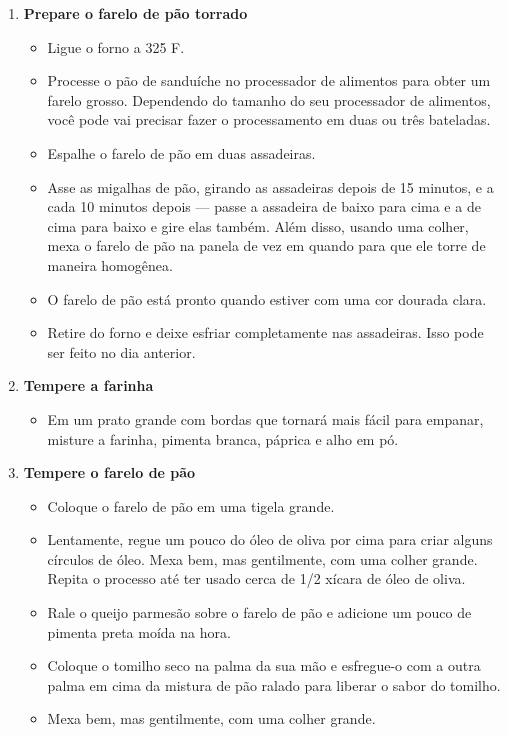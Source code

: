 \documentclass [11pt, papel de carta] {article}
\begin{document}
\begin {description}
\begin {enumerate}
\begin {itemize}
\end {itemize}
\item {\bf Prepare o farelo de pão torrado}
\begin {itemize}
\item Ligue o forno a 325 F.
\item Processe o pão de sanduíche  no processador de alimentos para obter um farelo grosso. Dependendo do tamanho do seu processador de alimentos, você pode vai precisar fazer o processamento em duas ou três bateladas.
\item Espalhe o farelo de p\~ao em duas assadeiras.
\item Asse as migalhas de pão, girando as assadeiras depois de 15 minutos, e a cada 10 minutos depois --- passe a assadeira de baixo para cima e a de cima para baixo e gire elas tamb\'em. Além disso, usando uma colher, mexa o farelo de pão na panela de vez em quando para que ele torre de maneira homog\^enea.
\item O farelo de pão est\'a pronto quando estiver com uma cor dourada clara.
\item Retire do forno e deixe esfriar completamente nas assadeiras. Isso pode ser feito no dia anterior.
\end {itemize}
\item {\bf Tempere a farinha}
\begin {itemize}
\item Em um prato grande com bordas que tornará mais fácil para empanar, misture a farinha, pimenta branca, páprica e alho em pó.
\end {itemize}
\item {\bf Tempere o farelo de pão}
\begin {itemize}
\item Coloque o farelo de pão em uma tigela grande.
\item Lentamente, regue um pouco do \'oleo de oliva por cima para criar alguns círculos de \'oleo. Mexa bem, mas gentilmente, com uma colher grande. Repita o processo até ter usado cerca de 1/2 xícara de \'oleo de oliva.
\item Rale o queijo parmesão sobre o farelo de p\~ao e adicione um pouco de pimenta preta mo\'ida na hora.
\item Coloque o tomilho seco na palma da sua mão e esfregue-o com a outra palma em cima da mistura de pão ralado para liberar o sabor do tomilho.
\item Mexa bem, mas gentilmente, com uma colher grande.
\end {itemize}

\end{enumerate}
\end{description}
\end{document}
